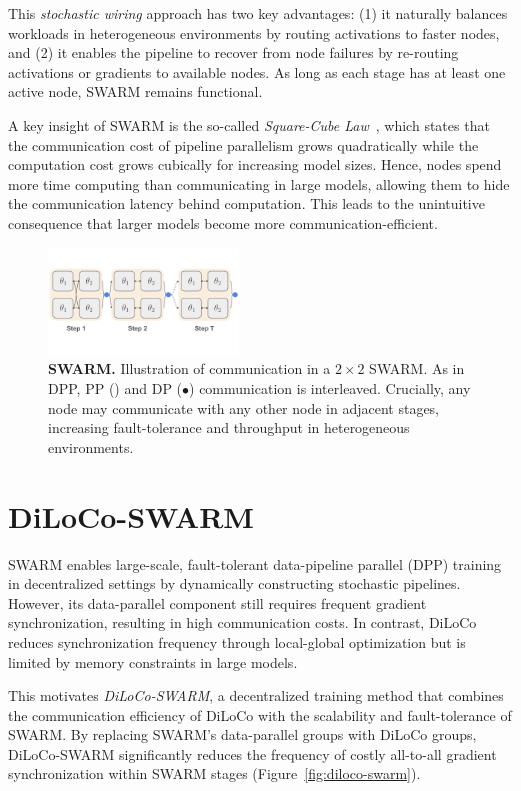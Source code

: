 \documentclass{article}
\newcommand{\orangebox}{\colorbox{oorange!50}{\hspace{0.3em}}}
\newcommand{\bluecircle}{\textcolor{bblue}{\LARGE$\bullet$}}
\begin{document}
This \textit{stochastic wiring} approach has two key advantages: (1) it naturally balances workloads in heterogeneous environments by routing activations to faster nodes, and (2) it enables the pipeline to recover from node failures by re-routing activations or gradients to available nodes. As long as each stage has at least one active node, SWARM remains functional.

A key insight of SWARM is the so-called \textit{Square-Cube Law}~\cite{ryabinin2023swarm}, which states that the communication cost of pipeline parallelism grows quadratically while the computation cost grows cubically for increasing model sizes. Hence, nodes spend more time computing than communicating in large models, allowing them to hide the communication latency behind computation. This leads to the unintuitive consequence that larger models become more communication-efficient.

\begin{figure}[ht]
    \centering
    \includegraphics[width=0.45\textwidth]{figures/swarm.pdf}
    \caption{\textbf{SWARM.} Illustration of communication in a $2 \times 2$ SWARM. As in DPP, PP (\orangebox) and DP (\bluecircle) communication is interleaved. Crucially, any node may communicate with any other node in adjacent stages, increasing fault-tolerance and throughput in heterogeneous environments.}
    \label{fig:swarm}
\end{figure}

\section{DiLoCo-SWARM}

SWARM enables large-scale, fault-tolerant data-pipeline parallel (DPP) training in decentralized settings by dynamically constructing stochastic pipelines. However, its data-parallel component still requires frequent gradient synchronization, resulting in high communication costs. In contrast, DiLoCo~\cite{douillard2023diloco} reduces synchronization frequency through local-global optimization but is limited by memory constraints in large models.

This motivates \textit{DiLoCo-SWARM}, a decentralized training method that combines the communication efficiency of DiLoCo with the scalability and fault-tolerance of SWARM. By replacing SWARM's data-parallel groups with DiLoCo groups, DiLoCo-SWARM significantly reduces the frequency of costly
all-to-all gradient synchronization within SWARM stages (Figure~\ref{fig:diloco-swarm}).
\end{document}
